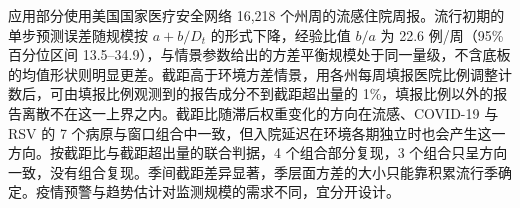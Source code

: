 应用部分使用美国国家医疗安全网络 16,218 个州周的流感住院周报。流行初期的单步预测误差随规模按 $a+b/D_t$ 的形式下降，经验比值 $b/a$ 为 22.6 例/周（95\% 百分位区间 13.5--34.9），与情景参数给出的方差平衡规模处于同一量级，不含底板的均值形状则明显更差。截距高于环境方差情景，用各州每周填报医院比例调整计数后，可由填报比例观测到的报告成分不到截距超出量的 1\%，填报比例以外的报告离散不在这一上界之内。截距比随滞后权重变化的方向在流感、COVID-19 与 RSV 的 7 个病原与窗口组合中一致，但入院延迟在环境各期独立时也会产生这一方向。按截距比与截距超出量的联合判据，4 个组合部分复现，3 个组合只呈方向一致，没有组合复现。季间截距差异显著，季层面方差的大小只能靠积累流行季确定。疫情预警与趋势估计对监测规模的需求不同，宜分开设计。
